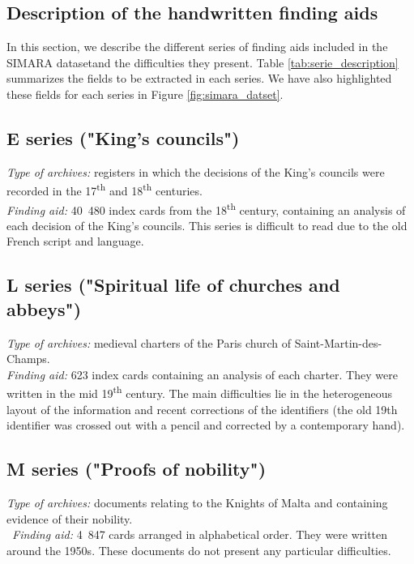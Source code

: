\documentclass[runningheads]{llncs}
\begin{document}
\subsection{Description of the handwritten finding aids}
In this section, we describe the different series of finding aids included in the SIMARA datasetand the difficulties they present. Table \ref{tab:serie_description} summarizes the fields to be extracted in each series. We have also highlighted these fields for each series in Figure \ref{fig:simara_datset}.


\subsection*{E series ("King's councils")}

\textit{Type of archives:} registers in which the decisions of the King’s councils were recorded in the 17\textsuperscript{th} and 18\textsuperscript{th} centuries.\\
\textit{Finding aid:} 40~480 index cards from the 18\textsuperscript{th} century, containing an analysis of each decision of the King’s councils. This series is difficult to read due to the old French script and language.  




\subsection*{L series ("Spiritual life of churches and abbeys")}

\textit{Type of archives:} medieval charters of the Paris church of Saint-Martin-des-Champs.\\
\textit{Finding aid:} 623 index cards containing an analysis of each charter. They were written in the mid 19\textsuperscript{th} century. The main difficulties lie in the heterogeneous layout of the information and recent corrections of the identifiers (the old 19th identifier was crossed out with a pencil and corrected by a contemporary hand).

\subsection*{M series ("Proofs of nobility")}

\textit{Type of archives:} documents relating to the Knights of Malta and containing evidence of their nobility.\\\
\textit{Finding aid:} 4~847 cards arranged in alphabetical order. They were written around the 1950s. These documents do not present any particular difficulties.
\end{document}
